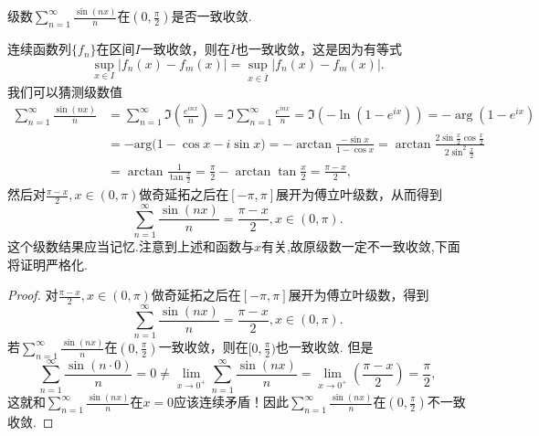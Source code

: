 \documentclass[../../main.tex]{subfiles}
\begin{document}
\begin{example}
级数\(\sum_{n=1}^{\infty} \frac{\sin(nx)}{n}\)在\((0, \frac{\pi}{2})\)是否一致收敛.
\end{example}
\begin{note}
连续函数列\(\{f_n\}\)在区间\(I\)一致收敛，则在\(\overline{I}\)也一致收敛，这是因为有等式
\[
\sup_{x \in I} |f_n(x) - f_m(x)| = \sup_{x \in \overline{I}} |f_n(x) - f_m(x)|.
\]
我们可以猜测级数值
\begin{align*}
\sum_{n=1}^{\infty} \frac{\sin(nx)}{n} &= \sum_{n=1}^{\infty} \Im \left( \frac{e^{inx}}{n} \right) = \Im \sum_{n=1}^{\infty} \frac{e^{inx}}{n} = \Im (-\ln(1 - e^{ix})) = -\arg(1 - e^{ix}) \\
&= -\mathrm{arg(}1-\cos x-i\sin x)=-\arctan  \frac{-\sin x}{1-\cos x}=\arctan  \frac{2\sin \frac{x}{2}\cos \frac{x}{2}}{2\sin ^2\frac{x}{2}}\\
&= \arctan  \frac{1}{\tan \frac{x}{2}}=\frac{\pi}{2}-\arctan \tan \frac{x}{2}=\frac{\pi -x}{2},
\end{align*}
然后对\(\frac{\pi - x}{2}, x \in (0, \pi)\)做奇延拓之后在\([-\pi, \pi]\)展开为傅立叶级数，从而得到
\[
\sum_{n=1}^{\infty} \frac{\sin(nx)}{n} = \frac{\pi - x}{2}, x \in (0, \pi).
\]
这个级数结果应当记忆.注意到上述和函数与$x$有关,故原级数一定不一致收敛,下面将证明严格化.
\end{note}
\begin{proof}
对\(\frac{\pi - x}{2}, x \in (0, \pi)\)做奇延拓之后在\([-\pi, \pi]\)展开为傅立叶级数，得到
\[
\sum_{n=1}^{\infty} \frac{\sin(nx)}{n} = \frac{\pi - x}{2}, x \in (0, \pi).
\]
若\(\sum_{n=1}^{\infty} \frac{\sin(nx)}{n}\)在\((0, \frac{\pi}{2})\)一致收敛，则在\([0, \frac{\pi}{2})\)也一致收敛. 但是
\[
\sum_{n=1}^{\infty} \frac{\sin(n \cdot 0)}{n} =0 \neq \lim_{x \to 0^+} \sum_{n=1}^{\infty} \frac{\sin(nx)}{n} = \lim_{x \to 0^+} \left( \frac{\pi - x}{2} \right) = \frac{\pi}{2},
\]
这就和\(\sum_{n=1}^{\infty} \frac{\sin(nx)}{n}\)在\(x = 0\)应该连续矛盾！因此\(\sum_{n=1}^{\infty} \frac{\sin(nx)}{n}\)在\((0, \frac{\pi}{2})\)不一致收敛.

\end{proof}
\end{document}
